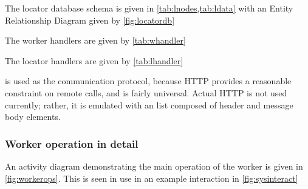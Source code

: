 



The locator database schema is given in \cref{tab:lnodes,tab:ldata} with an Entity Relationship Diagram given by \cref{fig:locatordb}




The worker handlers are given by \cref{tab:whandler}


The locator handlers are given by \cref{tab:lhandler}


 is used as the communication protocol, because HTTP provides a reasonable constraint on remote calls, and is fairly universal.
Actual HTTP is not used currently; rather, it is emulated with an \R{} list composed of header and message body elements.

\subsubsection{Worker operation in detail}

An activity diagram demonstrating the main operation of the worker is given in \cref{fig:workerops}.
This is seen in use in an example interaction in \cref{fig:sysinteract}


